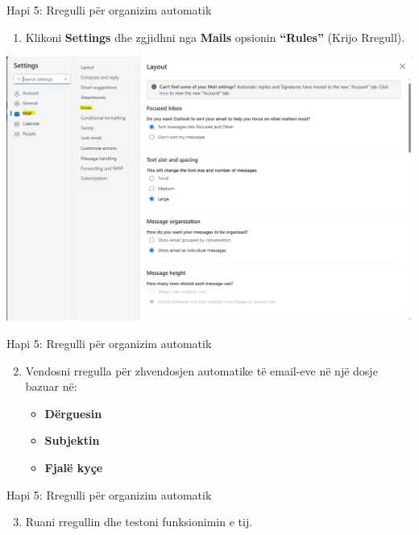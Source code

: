 \documentclass[
  ignorenonframetext,
]{beamer}
\providecommand{\tightlist}{%
  \setlength{\itemsep}{0pt}\setlength{\parskip}{0pt}}
\begin{document}
\begin{frame}{Hapi 5: Rregulli për organizim automatik}
\label{hapi-5-rregulli-puxebr-organizim-automatik}
\begin{enumerate}
\tightlist
\item
  Klikoni \textbf{Settings} dhe zgjidhni nga \textbf{Mails} opsionin
  \textbf{``Rules''} (Krijo Rregull).
\end{enumerate}

\includegraphics{./images/outlook16.png}
\end{frame}

\begin{frame}{Hapi 5: Rregulli për organizim automatik}
\label{hapi-5-rregulli-puxebr-organizim-automatik-1}
\begin{enumerate}
\setcounter{enumi}{1}
\item
  Vendosni rregulla për zhvendosjen automatike të email-eve në një dosje
  bazuar në:

  \begin{itemize}
  \item
    \textbf{Dërguesin}
  \item
    \textbf{Subjektin}
  \item
    \textbf{Fjalë kyçe}
  \end{itemize}
\end{enumerate}
\end{frame}

\begin{frame}{Hapi 5: Rregulli për organizim automatik}
\label{hapi-5-rregulli-puxebr-organizim-automatik-2}
\begin{enumerate}
\setcounter{enumi}{2}
\tightlist
\item
  Ruani rregullin dhe testoni funksionimin e tij.
\end{enumerate}
\end{frame}
\end{document}

